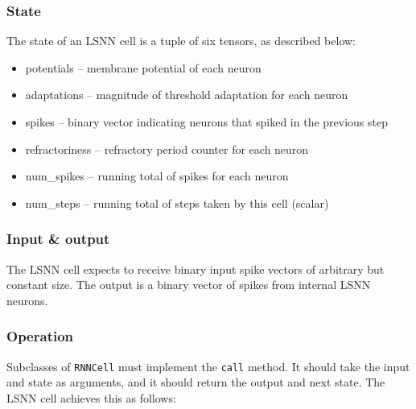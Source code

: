 \documentclass[../../report.tex]{subfiles}
\begin{document}
\subsubsection{State}
The state of an LSNN cell is a tuple of six tensors, as described below:

\begin{itemize}
  \item potentials -- membrane potential of each neuron
  \item adaptations -- magnitude of threshold adaptation for each neuron
  \item spikes -- binary vector indicating neurons that spiked in the previous step
  \item refractoriness -- refractory period counter for each neuron
  \item num\_spikes -- running total of spikes for each neuron
  \item num\_steps -- running total of steps taken by this cell (scalar)
\end{itemize}

\subsubsection{Input \& output}

The LSNN cell expects to receive binary input spike vectors of arbitrary but
constant size. The output is a binary vector of spikes from internal LSNN
neurons.

\subsubsection{Operation}

Subclasses of \texttt{RNNCell} must implement the \texttt{call} method. It
should take the input and state as arguments, and it should return the output
and next state. The LSNN cell achieves this as follows:
\end{document}
